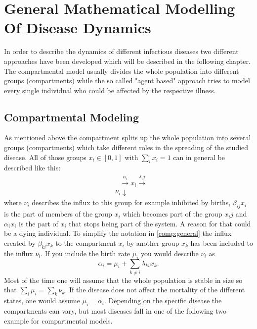 \section{General Mathematical Modelling Of Disease Dynamics}
\label{chap:generalModeling}
In order to describe the dynamics of different infectious diseases two different approaches have been developed which will be described in the following chapter.
The compartmental model usually divides the whole population into different groups (compartments) while the so called "agent based" approach tries to model every single individual who could be affected by the respective illness. 
\subsection{Compartmental Modeling}
As mentioned above the compartment splits up the whole population into several groups (compartments) which take different roles in the spreading of the studied disease.
All of those groups $x_i \in [0,1] \text{ with } \sum_i x_i =1 $ can in general be described like this:
\begin{eqnarray}
&\text{     }\xrightarrow{\alpha_i}  x_i \xrightarrow{\lambda_ij}   \label{comp:general} \\
&{\nu_i} \downarrow  \nonumber
\end{eqnarray}
where $\nu_i$ describes the influx to this group for example inhibited by births, $\beta_{ij} x_i$ is the part of members of the group $x_i$ which becomes part of the group $x_ij$ and $\alpha_i x_i$ is the part of $x_i$ that stops being part of the system. A reason for that could be a dying individual. To simplify the notation in \ref{comp:general} the influx created by $\beta_{ki} x_k$ to the compartment $x_i$ by another group $x_k$ has been included to the influx $\nu_i$. If you include the birth rate $\mu_i$ you would describe $\nu_i$ as 
\begin{equation}
\alpha_i = \mu_i + \sum_{k\neq i}{}\lambda_{ki} x_k.
\end{equation}
Most of the time one will assume that the whole population is stable in size so that $\sum_i \mu_i = \sum_{k} \nu_k$. If the disease does not affect the mortality of the different states, one would assume $\mu_i = \alpha_i$.
Depending on the specific disease the compartments can vary, but most diseases fall in one of the following two example for compartmental models.
